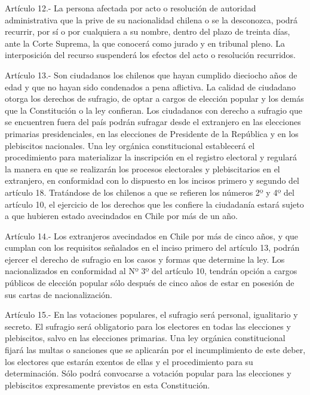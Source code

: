     Artículo 12.- La persona afectada por acto o resolución de autoridad administrativa que la prive de su nacionalidad chilena o se la desconozca, podrá recurrir, por sí o por cualquiera a su nombre, dentro del plazo de treinta días, ante la Corte Suprema, la que conocerá como jurado y en tribunal pleno. La interposición del recurso suspenderá los efectos del acto o resolución recurridos.


    Artículo 13.- Son ciudadanos los chilenos que hayan cumplido dieciocho años de edad y que no hayan sido condenados a pena aflictiva.
    La calidad de ciudadano otorga los derechos de sufragio, de optar a cargos de elección popular y los demás que la Constitución o la ley confieran.
    Los ciudadanos con derecho a sufragio que se encuentren fuera del país podrán sufragar desde el extranjero en las elecciones primarias presidenciales, en las elecciones de Presidente de la República y en los plebiscitos nacionales. Una ley orgánica constitucional establecerá el procedimiento para materializar la inscripción en el registro electoral y regulará la manera en que se realizarán los procesos electorales y plebiscitarios en el extranjero, en conformidad con lo dispuesto en los incisos primero y segundo del artículo 18.
    Tratándose de los chilenos a que se refieren los números 2º y 4º del artículo 10, el ejercicio de los derechos que les confiere la ciudadanía estará sujeto a que hubieren estado avecindados en Chile por más de un año.



    Artículo 14.- Los extranjeros avecindados en Chile por más de cinco años, y que cumplan con los requisitos señalados en el inciso primero del artículo 13, podrán ejercer el derecho de sufragio en los casos y formas que determine la ley.
    Los nacionalizados en conformidad al Nº 3º del artículo 10, tendrán opción a cargos públicos de elección popular sólo después de cinco años de estar en posesión de sus cartas de nacionalización.


    Artículo 15.- En las votaciones populares, el sufragio será personal, igualitario y secreto.   
    El sufragio será obligatorio para los electores en todas las elecciones y plebiscitos, salvo en las elecciones primarias. Una ley orgánica constitucional fijará las multas o sanciones que se aplicarán por el incumplimiento de este deber, los electores que estarán exentos de ellas y el procedimiento para su determinación.
    Sólo podrá convocarse a votación popular para las elecciones y plebiscitos expresamente previstos en esta Constitución.

